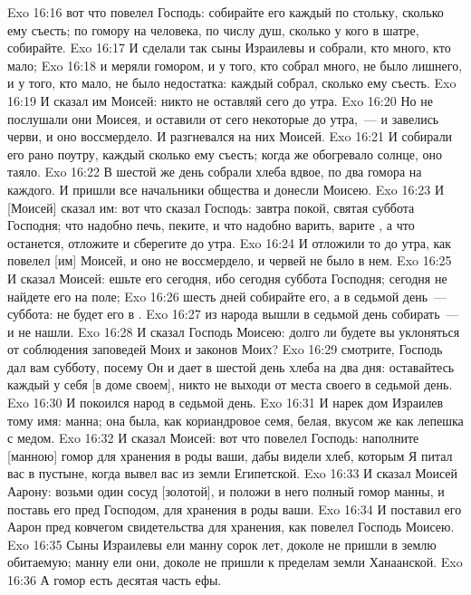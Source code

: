 \vs Exo 16:16 вот что повелел Господь: собирайте его каждый по стольку, сколько ему съесть; по гомору на человека, по числу душ, сколько у кого в шатре, собирайте.
\vs Exo 16:17 И сделали так сыны Израилевы и собрали, кто много, кто мало;
\vs Exo 16:18 и меряли гомором, и у того, кто собрал много, не было лишнего, и у того, кто мало, не было недостатка: каждый собрал, сколько ему съесть.
\vs Exo 16:19 И сказал им Моисей: никто не оставляй сего до утра.
\vs Exo 16:20 Но не послушали они Моисея, и оставили от сего некоторые до утра,~--- и завелись черви, и оно воссмердело. И разгневался на них Моисей.
\vs Exo 16:21 И собирали его рано поутру, каждый сколько ему съесть; когда же обогревало солнце, оно таяло.
\vs Exo 16:22 В шестой же день собрали хлеба вдвое, по два гомора на каждого. И пришли все начальники общества и донесли Моисею.
\vs Exo 16:23 И [Моисей] сказал им: вот что сказал Господь: завтра покой, святая суббота Господня; что надобно печь, пеките, и что надобно варить, варите , а что останется, отложите и сберегите до утра.
\vs Exo 16:24 И отложили то до утра, как повелел [им] Моисей, и оно не воссмердело, и червей не было в нем.
\vs Exo 16:25 И сказал Моисей: ешьте его сегодня, ибо сегодня суббота Господня; сегодня не найдете его на поле;
\vs Exo 16:26 шесть дней собирайте его, а в седьмой день~--- суббота: не будет его в .
\vs Exo 16:27  из народа вышли в седьмой день собирать~--- и не нашли.
\rsbpar\vs Exo 16:28 И сказал Господь Моисею: долго ли будете вы уклоняться от соблюдения заповедей Моих и законов Моих?
\vs Exo 16:29 смотрите, Господь дал вам субботу, посему Он и дает в шестой день хлеба на два дня: оставайтесь каждый у себя [в доме своем], никто не выходи от места своего в седьмой день.
\vs Exo 16:30 И покоился народ в седьмой день.
\vs Exo 16:31 И нарек дом Израилев  тому имя: манна; она была, как кориандровое семя, белая, вкусом же как лепешка с медом.
\vs Exo 16:32 И сказал Моисей: вот что повелел Господь: наполните [манною] гомор для хранения в роды ваши, дабы видели хлеб, которым Я питал вас в пустыне, когда вывел вас из земли Египетской.
\vs Exo 16:33 И сказал Моисей Аарону: возьми один сосуд [золотой], и положи в него полный гомор манны, и поставь его пред Господом, для хранения в роды ваши.
\vs Exo 16:34 И поставил его Аарон пред ковчегом свидетельства для хранения, как повелел Господь Моисею.
\rsbpar\vs Exo 16:35 Сыны Израилевы ели манну сорок лет, доколе не пришли в землю обитаемую; манну ели они, доколе не пришли к пределам земли Ханаанской.
\vs Exo 16:36 А гомор есть десятая часть ефы.
